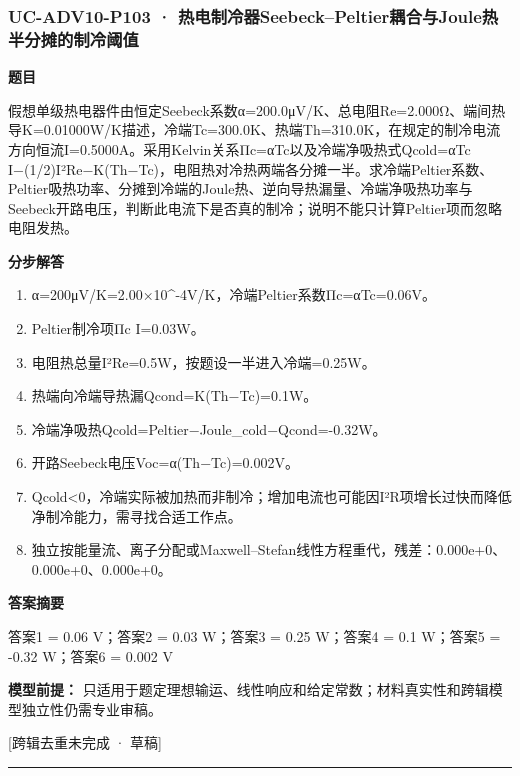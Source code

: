 \documentclass[UTF8,11pt,a4paper]{ctexart}
\begin{document}
\subsubsection*{UC-ADV10-P103 · 热电制冷器Seebeck–Peltier耦合与Joule热半分摊的制冷阈值}
\noindent\textbf{题目}\par
假想单级热电器件由恒定Seebeck系数α=200.0μV/K、总电阻Re=2.000Ω、端间热导K=0.01000W/K描述，冷端Tc=300.0K、热端Th=310.0K，在规定的制冷电流方向恒流I=0.5000A。采用Kelvin关系Πc=αTc以及冷端净吸热式Qcold=αTc I−(1/2)I²Re−K(Th−Tc)，电阻热对冷热两端各分摊一半。求冷端Peltier系数、Peltier吸热功率、分摊到冷端的Joule热、逆向导热漏量、冷端净吸热功率与Seebeck开路电压，判断此电流下是否真的制冷；说明不能只计算Peltier项而忽略电阻发热。\par
\medskip\noindent\textbf{分步解答}
\begin{enumerate}
\item α=200μV/K=2.00×10\textasciicircum{}-4V/K，冷端Peltier系数Πc=αTc=0.06V。
\item Peltier制冷项Πc I=0.03W。
\item 电阻热总量I²Re=0.5W，按题设一半进入冷端=0.25W。
\item 热端向冷端导热漏Qcond=K(Th−Tc)=0.1W。
\item 冷端净吸热Qcold=Peltier−Joule\_cold−Qcond=-0.32W。
\item 开路Seebeck电压Voc=α(Th−Tc)=0.002V。
\item Qcold<0，冷端实际被加热而非制冷；增加电流也可能因I²R项增长过快而降低净制冷能力，需寻找合适工作点。
\item 独立按能量流、离子分配或Maxwell–Stefan线性方程重代，残差：0.000e+0、0.000e+0、0.000e+0。
\end{enumerate}
\noindent\textbf{答案摘要}\par
答案1 = 0.06 V；答案2 = 0.03 W；答案3 = 0.25 W；答案4 = 0.1 W；答案5 = -0.32 W；答案6 = 0.002 V\par
\noindent\textbf{模型前提：}
只适用于题定理想输运、线性响应和给定常数；材料真实性和跨辑模型独立性仍需专业审稿。\par
\noindent\textcolor{red!65!black}{[跨辑去重未完成 · 草稿]} \par
\medskip\hrule\medskip
{}
\end{document}
